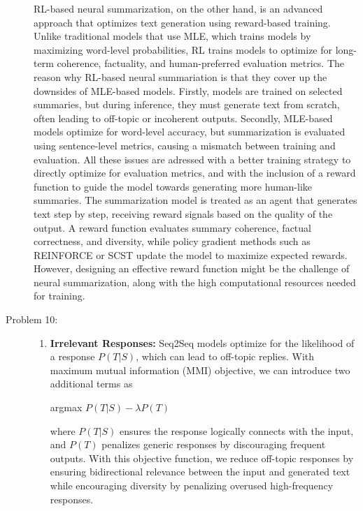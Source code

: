 \documentclass[10pt]{article}
\begin{document}
\begin{description}
RL-based neural summarization, on the other hand, is an advanced approach that optimizes text generation using reward-based training. 
Unlike traditional models that use MLE, which trains models by maximizing word-level probabilities, RL trains models to optimize for long-term coherence, factuality, and human-preferred evaluation metrics.
The reason why RL-based neural summariation is that they cover up the downsides of MLE-based models.
Firstly, models are trained on selected summaries, but during inference, they must generate text from scratch, often leading to off-topic or incoherent outputs.
Secondly, MLE-based models optimize for word-level accuracy, but summarization is evaluated using sentence-level metrics, causing a mismatch between training and evaluation.
All these issues are adressed with a better training strategy to directly optimize for evaluation metrics, and with the inclusion of a reward function to 
guide the model towards generating more human-like summaries.
The summarization model is treated as an agent that generates text step by step, receiving reward signals based on the quality of the output.
A reward function evaluates summary coherence, factual correctness, and diversity, while policy gradient methods such as REINFORCE 
or SCST update the model to maximize expected rewards.
However, designing an effective reward function might be the challenge of neural summarization, along with the high computational resources needed for training.

\pagebreak

\item[Problem 10:]  \hfill %

\begin{enumerate}
    \item \textbf{Irrelevant Responses:} Seq2Seq models optimize for the likelihood of a response $P(T|S)$, which can lead to off-topic replies.
    With maximum mutual information (MMI) objective, we can introduce two additional terms as 

    \begin{center}
        argmax $P(T|S) - \lambda P(T)$
    \end{center}

    where $P(T|S)$ ensures the response logically connects with the input, and $P(T)$ penalizes generic responses by discouraging frequent outputs.
    With this objective function, we reduce off-topic responses by ensuring bidirectional relevance between the input and generated text while
    encouraging diversity by penalizing overused high-frequency responses.


\end{enumerate}
\end{description}
\end{document}
